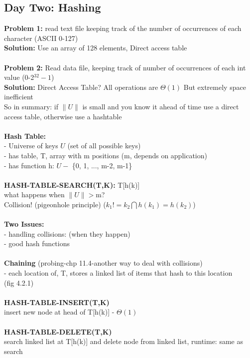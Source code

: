 \documentclass{article}
\begin{document}
	\subsection{Day Two: Hashing}
	\textbf{Problem 1:} read text file keeping track of the number of occurrences of each character (ASCII 0-127)\\
	\textbf{Solution: } Use an array of 128 elements, Direct access table\\\\
	\textbf{Problem 2:} Read data file, keeping track of number of occurrences of each int value (0-2$^{32}-1$)\\
	\textbf{Solution: } Direct Access Table? All operations are $\Theta(1)$ But extremely space inefficient\\
	So in summary: if $\|U\|$ is small and you know it ahead of time use a direct access table, otherwise use a hashtable\\\\
	\textbf{Hash Table:}\\
	- Universe of keys $U$ (set of all possible keys)\\
	- has table, T, array with m positions (m, depends on application)\\
	- has function h: $U -$ \{0, 1, ..., m-2, m-1\}\\\\
	\textbf{HASH-TABLE-SEARCH(T,K):} T[h(k)] \\
	what happens when $\|U\| > $m?\\
	Collision! (pigeonhole principle) ($k_1 != k_2 \bigcap h(k_1) = h(k_2)$)\\\\
	\textbf{Two Issues:}\\
	- handling collisions: (when they happen)\\
	- good hash functions\\\\
	\textbf{Chaining} (probing-chp 11.4-another way to deal with collisions)\\
	- each location of, T, stores a linked list of items that hash to this location\\
	(fig 4.2.1)\\\\
	\textbf{HASH-TABLE-INSERT(T,K)}\\
	insert new node at head of T[h(k)] - $\Theta(1)$\\\\
	\textbf{HASH-TABLE-DELETE(T,K)}\\
	search linked list at T[h(k)] and delete node from linked list, runtime: same as search\\\\
\end{document}

